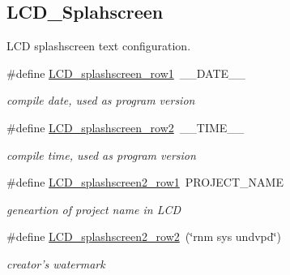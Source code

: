 \subsection*{L\-C\-D\-\_\-\-Splahscreen}
\label{_amgrpc8a0e87324ba2aa8fab84271cca0dcee}%
L\-C\-D splashscreen text configuration. \begin{DoxyCompactItemize}
\item 
\hypertarget{group__lcd__h_ga251cf3018caf604ae46e1636e2678cda}{\#define \hyperlink{group__lcd__h_ga251cf3018caf604ae46e1636e2678cda}{L\-C\-D\-\_\-splashscreen\-\_\-row1}~\-\_\-\-\_\-\-D\-A\-T\-E\-\_\-\-\_\-}\label{group__lcd__h_ga251cf3018caf604ae46e1636e2678cda}

\begin{DoxyCompactList}\small\item\em compile date, used as program version \end{DoxyCompactList}\item 
\hypertarget{group__lcd__h_ga2f0e22d3d76e41b82bc3c55c1564143c}{\#define \hyperlink{group__lcd__h_ga2f0e22d3d76e41b82bc3c55c1564143c}{L\-C\-D\-\_\-splashscreen\-\_\-row2}~\-\_\-\-\_\-\-T\-I\-M\-E\-\_\-\-\_\-}\label{group__lcd__h_ga2f0e22d3d76e41b82bc3c55c1564143c}

\begin{DoxyCompactList}\small\item\em compile time, used as program version \end{DoxyCompactList}\item 
\hypertarget{group__lcd__h_gac7bb85d0a6249381b2d7050da3e2e99c}{\#define \hyperlink{group__lcd__h_gac7bb85d0a6249381b2d7050da3e2e99c}{L\-C\-D\-\_\-splashscreen2\-\_\-row1}~P\-R\-O\-J\-E\-C\-T\-\_\-\-N\-A\-M\-E}\label{group__lcd__h_gac7bb85d0a6249381b2d7050da3e2e99c}

\begin{DoxyCompactList}\small\item\em geneartion of project name in L\-C\-D \end{DoxyCompactList}\item 
\hypertarget{group__lcd__h_ga5c961ed231f58622f0d35f1f29439bbd}{\#define \hyperlink{group__lcd__h_ga5c961ed231f58622f0d35f1f29439bbd}{L\-C\-D\-\_\-splashscreen2\-\_\-row2}~(\char`\"{}rnm sys undvpd\char`\"{})}\label{group__lcd__h_ga5c961ed231f58622f0d35f1f29439bbd}

\begin{DoxyCompactList}\small\item\em creator's watermark \end{DoxyCompactList}\end{DoxyCompactItemize}
